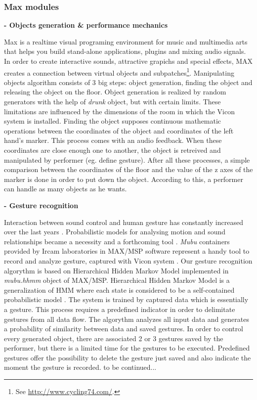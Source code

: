 \documentclass{nime-alternate}
\begin{document}
\subsubsection{Max modules}
\textbf{- Objects generation \& performance mechanics}\\ \par
Max is a realtime visual programing environment for music and multimedia arts that helps you build stand-alone applications, plugins and mixing audio signals. In order to create interactive sounds, attractive grapichs and special effects, MAX creates a connection between virtual objects and subpatches\footnote{See \url{http://www.cycling74.com/}.}.
Manipulating objects algorithm consists of 3 big steps: object generation, finding the object and releasing the object on the floor. Object generation is realized by random generators with the help of \textit{drunk} object, but with certain limits. These limitations are influenced by the dimensions of the room in which the Vicon system is installed. Finding the object supposes continuous mathematic operations between the coordinates of the object and coordinates of the left hand's marker. This process comes with an audio feedback. When these coordinates are close enough one to another, the object is retreived and manipulated by performer (eg. define gesture). After all these processes, a simple comparison between the coordinates of the floor and the value of the z axes of the marker is done in order to put down the object. According to this, a performer can handle as many objects as he wants.\\ \par
\textbf{- Gesture recognition}\\ \par
Interaction between sound control and human gesture has constantly increased over the last years \cite{Gestureanalysis}. Probabilistic models for analysing motion and sound relationships became a necessity and a forthcoming tool \cite{probabilisticmodels}. \textit{Mubu} containers provided by Ircam laboratories in MAX/MSP software represent a handy tool to record and analyze gesture, captured with Vicon system \cite{mubu}. Our gesture recognition algorythm is based on Hierarchical Hidden Markov Model implemented in \textit{mubu.hhmm} object of MAX/MSP. Hierarchical Hidden Markov Model is a generalization of HMM where each state is considered to be a self-contained probabilistic model \cite{hhmm}. The system is trained by captured data which is essentially a gesture. This process requires a predefined indicator in order to delimitate gestures from all data flow. The algorythm analyzes all input data and generates a probability of similarity between data and saved gestures. In order to control every generated object, there are associated 2 or 3 gestures saved by the performer, but there is a limited time for the gestures to be executed. Predefined gestures offer the possibility to delete the gesture just saved and also indicate the moment the gesture is recorded. to be continued...
\end{document}

